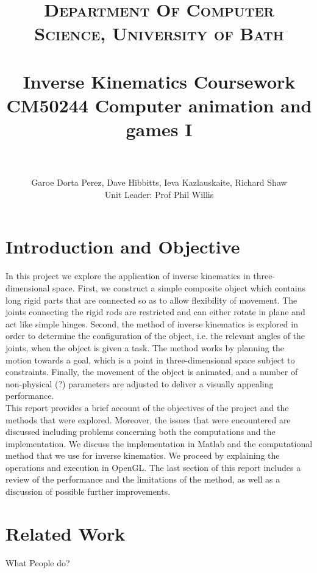 \documentclass[paper=a4, fontsize=11pt]{scrartcl} %
\title{	
\normalfont \normalsize 
\textsc{Department Of Computer Science, University of Bath} \\ [5pt] %
\horrule{0.7pt} \\[0.2cm] %
\Huge Inverse Kinematics Coursework \\ %
\vspace{7 mm}
\Large CM50244 \: Computer animation and games I \\
\horrule{0.7pt} \\[0.0cm] %
}
\author{Garoe Dorta Perez, Dave Hibbitts, Ieva Kazlauskaite, Richard Shaw \\ \Large Unit Leader: Prof Phil Willis \\}  %
\numberwithin{equation}{section} %
\numberwithin{figure}{section} %
\numberwithin{table}{section} %
\begin{document}
\vspace*{\fill}
\begin{center}
\begin{minipage}{1.0\textwidth}

\maketitle %

\end{minipage}
\end{center}
\vfill
\clearpage


\section{Introduction and Objective} 
In this project we explore the application of inverse kinematics in three-dimensional space. First, we construct a simple composite object which contains long rigid parts that are connected so as to allow flexibility of movement. The joints connecting the rigid rods are restricted and can either rotate in plane and act like simple hinges. Second, the method of inverse kinematics is explored in order to determine the configuration of the object, i.e. the relevant angles of the joints, when the object is given a task. The method works by planning the motion towards a goal, which is a point in three-dimensional space subject to constraints. Finally, the movement of the object is animated, and a number of non-physical (?) parameters are adjusted to deliver a visually appealing performance. \\

This report provides a brief account of the objectives of the project and the methods that were explored. Moreover, the issues that were encountered are discussed including problems concerning both the computations and the implementation. We discuss the implementation in Matlab and the computational method that we use for inverse kinematics. We proceed by explaining the operations and execution in OpenGL. The last section of this report includes a review of the performance and the limitations of the method, as well as a discussion of possible further improvements.



\section{Related Work}
What People do?
\end{document}
